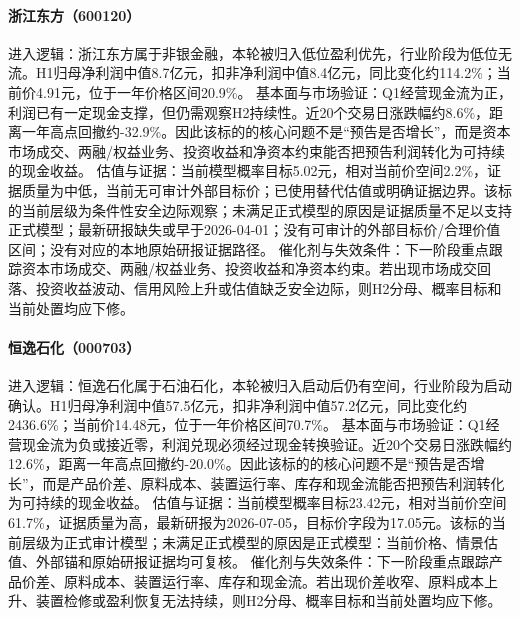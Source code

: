 \paragraph{浙江东方（600120）}
进入逻辑：浙江东方属于非银金融，本轮被归入低位盈利优先，行业阶段为低位无流。H1归母净利润中值8.7亿元，扣非净利润中值8.4亿元，同比变化约114.2\%；当前价4.91元，位于一年价格区间20.9\%。
基本面与市场验证：Q1经营现金流为正，利润已有一定现金支撑，但仍需观察H2持续性。近20个交易日涨跌幅约8.6\%，距离一年高点回撤约-32.9\%。因此该标的的核心问题不是“预告是否增长”，而是资本市场成交、两融/权益业务、投资收益和净资本约束能否把预告利润转化为可持续的现金收益。
估值与证据：当前模型概率目标5.02元，相对当前价空间2.2\%，证据质量为中低，当前无可审计外部目标价；已使用替代估值或明确证据边界。该标的当前层级为条件性安全边际观察；未满足正式模型的原因是证据质量不足以支持正式模型；最新研报缺失或早于2026-04-01；没有可审计的外部目标价/合理价值区间；没有对应的本地原始研报证据路径。
催化剂与失效条件：下一阶段重点跟踪资本市场成交、两融/权益业务、投资收益和净资本约束。若出现市场成交回落、投资收益波动、信用风险上升或估值缺乏安全边际，则H2分母、概率目标和当前处置均应下修。

\paragraph{恒逸石化（000703）}
进入逻辑：恒逸石化属于石油石化，本轮被归入启动后仍有空间，行业阶段为启动确认。H1归母净利润中值57.5亿元，扣非净利润中值57.2亿元，同比变化约2436.6\%；当前价14.48元，位于一年价格区间70.7\%。
基本面与市场验证：Q1经营现金流为负或接近零，利润兑现必须经过现金转换验证。近20个交易日涨跌幅约12.6\%，距离一年高点回撤约-20.0\%。因此该标的的核心问题不是“预告是否增长”，而是产品价差、原料成本、装置运行率、库存和现金流能否把预告利润转化为可持续的现金收益。
估值与证据：当前模型概率目标23.42元，相对当前价空间61.7\%，证据质量为高，最新研报为2026-07-05，目标价字段为17.05元。该标的当前层级为正式审计模型；未满足正式模型的原因是正式模型：当前价格、情景估值、外部锚和原始研报证据均可复核。
催化剂与失效条件：下一阶段重点跟踪产品价差、原料成本、装置运行率、库存和现金流。若出现价差收窄、原料成本上升、装置检修或盈利恢复无法持续，则H2分母、概率目标和当前处置均应下修。

